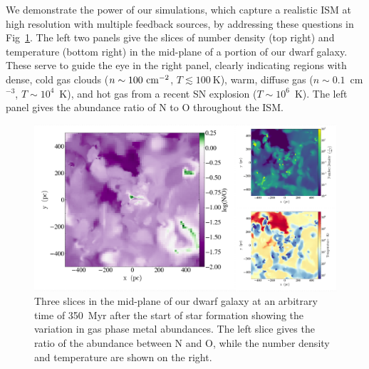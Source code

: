 \documentclass[twocolumn]{aastex61}
\begin{document}

We demonstrate the power of our simulations, which capture a realistic ISM at high resolution with multiple feedback sources, by addressing these questions in Fig~\ref{fig:metal_slices}. The left two panels give the slices of number density (top right) and temperature (bottom right) in the mid-plane of a portion of our dwarf galaxy. These serve to guide the eye in the right panel, clearly indicating regions with dense, cold gas clouds ($n \sim 100~\rm{cm}^{-2}$, $T \lesssim 100~$K), warm, diffuse gas ($n\sim 0.1$~cm$^{-3}$, $T\sim 10^{4}$~K), and hot gas from a recent SN explosion ($T\sim10^{6}$~K). The left panel gives the abundance ratio of N to O throughout the ISM.


\begin{figure}
\includegraphics[width=0.98\linewidth]{log_NO_panel}
            \caption{Three slices in the mid-plane of our dwarf galaxy at an arbitrary time of 350~Myr after the start of star formation showing the variation in gas phase metal abundances. The left slice gives the ratio of the abundance between N and O, while the number density and temperature are shown on the right. }
\label{fig:metal_slices}
\end{figure}
            
\end{document}
